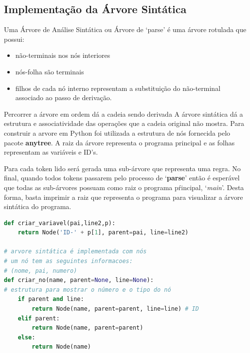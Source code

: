 \documentclass[12pt]{article}
\begin{document}
\subsection{Implementação da Árvore Sintática} 
Uma Árvore de Análise Sintática ou Árvore de `parse' é uma árvore
rotulada que possui:  
\begin{itemize}
	\item não-terminais nos nós interiores
	\item nós-folha são terminais
	\item filhos de cada nó interno representam a substituição do não-terminal associado ao passo de derivação.
\end{itemize}
Percorrer a árvore em ordem dá a cadeia sendo derivada
A árvore sintática dá a estrutura e associatividade das operações que a cadeia original não mostra. 
Para construir a arvore em Python foi utilizada a estrutura de nós fornecida  pelo pacote \textbf{anytree}. A raiz da árvore representa o programa principal e as folhas representam as variáveis e ID's.   
 
Para cada token lido será gerada uma sub-árvore que representa uma regra. No final, quando todos tokens passarem pelo processo de `\textbf{parse}' então é esperável que todas as sub-árvores possuam como raiz o programa pŕincipal, `\textit{main}'. Desta forma, basta imprimir a raiz que representa o programa para visualizar a árvore sintática do programa.  

\begin{lstlisting}[language= Python, caption=Criação de Nós na Árvore Sintática, label=cod:codd] 
def criar_variavel(pai,line2,p): 
	return Node('ID-' + p[1], parent=pai, line=line2)       

# arvore sintática é implementada com nós 
# um nó tem as seguintes informacoes:  
# (nome, pai, numero)
def criar_no(name, parent=None, line=None):
# estrutura para mostrar o número e o tipo do nó
	if parent and line:
		return Node(name, parent=parent, line=line) # ID
	elif parent:
		return Node(name, parent=parent)
	else:
		return Node(name)    
\end{lstlisting}
 
\end{document}
